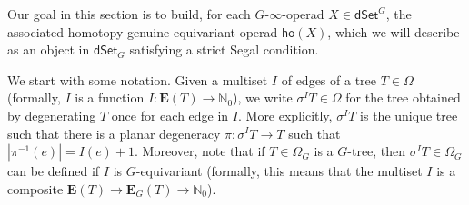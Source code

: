 \documentclass[a4paper,10pt
,draft
]{article}%
\renewcommand{\1}{\eta}%
\begin{document}
Our goal in this section is to build,
for each $G$-$\infty$-operad $X \in \mathsf{dSet}^G$,
the associated homotopy genuine equivariant operad
$\mathsf{ho} (X)$,
which we will describe as an object in
$\mathsf{dSet}_G$
satisfying a strict Segal condition.


We start with some notation. 
Given a multiset $I$ of edges of a tree $T \in \Omega$
(formally, $I$ is a function 
$I \colon \boldsymbol{E}(T) \to \mathbb{N}_0$),
we write $\sigma^I T \in \Omega$
for the tree obtained by degenerating $T$ once for each edge in $I$.
More explicitly, $\sigma^I T$ is the unique tree such that there is a planar degeneracy
$\pi \colon \sigma^I T \to T$
such that $|\pi^{-1}(e)| = I(e) + 1$.
Moreover,
note that if $T\in \Omega_G$ is a $G$-tree, 
then $\sigma^{I} T \in \Omega_{G}$
can be defined if $I$ is $G$-equivariant
(formally, this means that the multiset $I$ is a composite
$\boldsymbol{E}(T) \to \boldsymbol{E}_G(T)
\to \mathbb{N}_0$).
\end{document}
